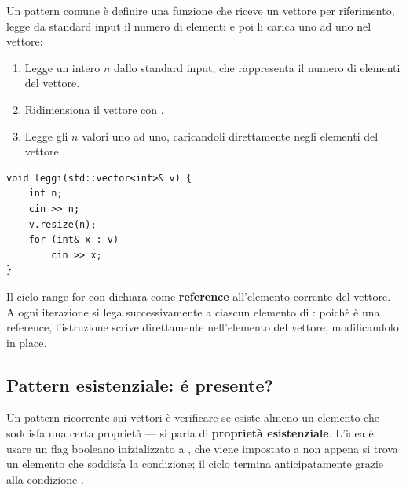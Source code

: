 
\begin{soluzione}
Un pattern comune \`e definire una funzione  che riceve
un vettore per riferimento, legge da standard input il numero di elementi
e poi li carica uno ad uno nel vettore:
\begin{enumerate}
  \item Legge un intero $n$ dallo standard input, che rappresenta
  il numero di elementi del vettore.
  \item Ridimensiona il vettore con .
  \item Legge gli $n$ valori uno ad uno, caricandoli direttamente
  negli elementi del vettore.
\end{enumerate}
\begin{codeexample}
  \begin{codebox}
    \begin{lstlisting}
void leggi(std::vector<int>& v) {
    int n;
    cin >> n;
    v.resize(n);
    for (int& x : v)
        cin >> x;
}
    \end{lstlisting}
  \end{codebox}
\end{codeexample}
Il ciclo range-for con  dichiara 
come \textbf{reference} all'elemento corrente del vettore.
A ogni iterazione  si lega successivamente a ciascun
elemento di : poich\`e \`e una reference,
l'istruzione  scrive direttamente
nell'elemento del vettore, modificandolo in place.
\end{soluzione}

\subsection{Pattern esistenziale: \'e presente?}

Un pattern ricorrente sui vettori \`e verificare se esiste almeno un elemento
che soddisfa una certa propriet\`a --- si parla di \textbf{propriet\`a esistenziale}.
L'idea \`e usare un flag booleano  inizializzato a ,
che viene impostato a  non appena si trova un elemento che soddisfa la condizione;
il ciclo termina anticipatamente grazie alla condizione .

